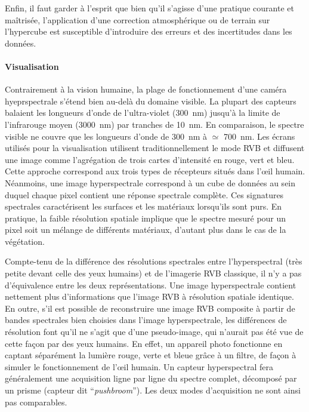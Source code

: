 Enfin, il faut garder à l'esprit que bien qu'il s'agisse d'une pratique courante et maîtrisée, l'application d'une correction atmosphérique ou de terrain sur l'hypercube est susceptible d'introduire des erreurs et des incertitudes dans les données.

\paragraph{Visualisation}
Contrairement à la vision humaine, la plage de fonctionnement d'une caméra hyeprspectrale s'étend bien au-delà du domaine visible. La plupart des capteurs balaient les longueurs d'onde de l'ultra-violet (\SI{300}{\nano\meter}) jusqu'à la limite de l'infrarouge moyen (\SI{3 000}{\nano\meter}) par tranches de \SI{10}{\nano\meter}. En comparaison, le spectre visible ne couvre que les longueurs d'onde de \SI{300}{\nano\meter} à $\simeq$ \SI{700}{\nano\meter}. Les écrans utilisés pour la visualisation utilisent traditionnellement le mode \gls{RVB} et diffusent une image comme l'agrégation de trois cartes d'intensité en rouge, vert et bleu. Cette approche correspond aux trois types de récepteurs situés dans l'\oe{}il humain. Néanmoins, une image hyperspectrale correspond à un cube de données au sein duquel chaque pixel contient une réponse spectrale complète. Ces signatures spectrales caractérisent les surfaces et les matériaux lorsqu'ils sont purs. En pratique, la faible résolution spatiale implique que le spectre mesuré pour un pixel soit un mélange de différents matériaux, d'autant plus dans le cas de la végétation.

Compte-tenu de la différence des résolutions spectrales entre l'hyperspectral (très petite devant celle des yeux humains) et de l'imagerie \gls{RVB} classique, il n'y a pas d'équivalence entre les deux représentations. Une image hyperspectrale contient nettement plus d'informations que l'image \gls{RVB} à résolution spatiale identique. En outre, s'il est possible de reconstruire une image \gls{RVB} composite à partir de bandes spectrales bien choisies dans l'image hyperspectrale, les différences de résolution font qu'il ne s'agit que d'une pseudo-image, qui n'aurait pas été vue de cette façon par des yeux humains. En effet, un appareil photo fonctionne en captant séparément la lumière rouge, verte et bleue grâce à un filtre, de façon à simuler le fonctionnement de l'\oe{}il humain. Un capteur hyperspectral fera généralement une acquisition ligne par ligne du spectre complet, décomposé par un prisme (capteur dit ``\textit{pushbroom}''). Les deux modes d'acquisition ne sont ainsi pas comparables.

